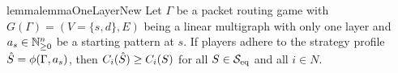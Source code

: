 \begin{restatable}{lemma}{lemmaOneLayerNew}\label{lemma_onelayernew}
Let $\Gamma$ be a packet routing game with $G(\Gamma)=(V=\{s,d\},E)$ being a linear multigraph with only one layer and $a_s\in \mathbb{N}_{\geq 0}^n$ be a starting pattern at $s$. If players adhere to the strategy profile $\hat{S}=\phi(\Gamma, a_s)$, then $C_i(\hat{S})\geq C_i(S)$ for all $S \in \mathcal{S}_{\operatorname{eq}}$ and all $i\in N$.
\end{restatable}




